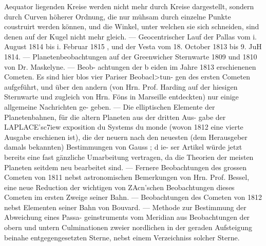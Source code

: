 \documentclass[12pt,a4paper]{article}
\begin{document}
Aequator liegenden Kreise werden nicht mehr durch Kreise dargestellt, sondern durch Curven höherer\newline
Ordnung, die nur mühsam durch einzelne Punkte coustruirt werden können, und die Winkel, unter\newline
welchen sie sich schneiden, sind denen auf der Kugel nicht mehr gleich. --- Geocentrischer Lauf der\newline
Pallas vom i. August 1814 bis i. Februar 1815 , und der Vesta vom 18. October 1813 bis 9. JuH 1814. ---\newline
Planetenbeobachtungen auf der Greenwicher Sternwarte 1809 und 1810 von Dr. Maskelyne. --- Beob-\newline
achtungen der b eiden im Jahre 1813 erschienenen Cometen. Es sind hier blos vier Pariser Beobacl>tun-\newline
gen des ersten Cometen aufgeführt, und über den andern (von Hrn. Prof. Harding auf der hiesigen\newline
Sternwarte und zugleich von Hrn. Föns in Marseille entdeckten) nur einige allgemeine Nachrichten ge-\newline
geben. --- Die elliptischen Elemente der Planetenbahnen, für die altern Planeten aus der dritten Aus-\newline
gabe der LAPLACE'sc7iew exposition du Systems du monde (wovon 1812 eine vierte Ausgabe erschienen ist),\newline
die der neuern nach den neuesten (dem Herausgeber damals bekannten) Bestimmungen von Gauss ; d ie-\newline
ser Artikel würde jetzt bereits eine fast gänzliche Umarbeitung vertragen, da die Theorien der meisten\newline
Planeten seitdem neu bearbeitet sind. --- Fernere Beobachtungen des grossen Cometen von 1811 nebst\newline
astronomischen Bemerkungen von Hrn. Prof. Bessel, eine neue Reduction der wichtigen von ZAcn'schen\newline
Beobachtungen dieses Cometen im ersten Zweige seiner Bahn. --- Beobachtungen des Cometen von 1812\newline
nebst Elementen seiner Bahn von Bouvard. --- Methode zur Bestimmung der Abweichung eines Passa-\newline
geinstruments vom Meridian aus Beobachtungen der obern und untern Culminationen zweier nordlichen\newline
in der geraden Aufsteigung beinahe entgegengesetzten Sterne, nebst einem Verzeichniss solcher Sterne.\newline
\end{document}
